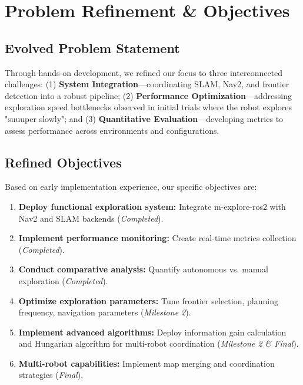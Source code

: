 \documentclass[conference]{IEEEtran}
\begin{document}
\section{Problem Refinement \& Objectives}

\subsection{Evolved Problem Statement}

Through hands-on development, we refined our focus to three interconnected challenges: (1) \textbf{System Integration}—coordinating SLAM, Nav2, and frontier detection into a robust pipeline; (2) \textbf{Performance Optimization}—addressing exploration speed bottlenecks observed in initial trials where the robot explores "suuuper slowly"; and (3) \textbf{Quantitative Evaluation}—developing metrics to assess performance across environments and configurations.

\subsection{Refined Objectives}

Based on early implementation experience, our specific objectives are:

\begin{enumerate}
\item \textbf{Deploy functional exploration system:} Integrate m-explore-ros2 with Nav2 and SLAM backends (\textit{Completed}).

\item \textbf{Implement performance monitoring:} Create real-time metrics collection (\textit{Completed}).

\item \textbf{Conduct comparative analysis:} Quantify autonomous vs. manual exploration (\textit{Completed}).

\item \textbf{Optimize exploration parameters:} Tune frontier selection, planning frequency, navigation parameters (\textit{Milestone 2}).

\item \textbf{Implement advanced algorithms:} Deploy information gain calculation and Hungarian algorithm for multi-robot coordination (\textit{Milestone 2 \& Final}).

\item \textbf{Multi-robot capabilities:} Implement map merging and coordination strategies (\textit{Final}).
\end{enumerate}
\end{document}
